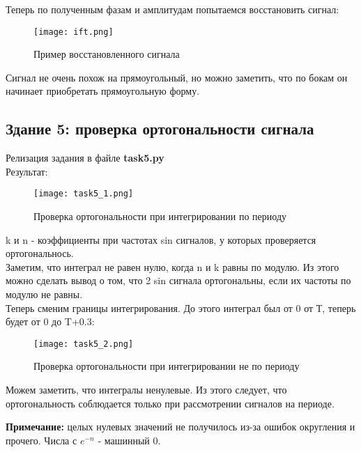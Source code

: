Теперь по полученным фазам и амплитудам попытаемся восстановить сигнал:

\begin{figure}[H]
    \centering
    \texttt{[image: ift.png]}
    \caption{Пример восстановленного сигнала}
\end{figure}

Сигнал не очень похож на прямоугольный, но можно заметить, что по бокам он начинает приобретать прямоугольную форму.

\subsection*{\textbf{Здание 5: проверка ортогональности сигнала}}

Релизация задания в файле \textbf{task5.py} \\

Результат: \\

\begin{figure}[H]
    \centering
    \texttt{[image: task5\_1.png]}
    \caption{Проверка ортогональности при интегрировании по периоду}
\end{figure}

k и n - коэффициенты при частотах sin сигналов, у которых проверяется ортогональнось. \\

Заметим, что интеграл не равен нулю, когда n и k равны по модулю. Из этого можно сделать вывод о том, что 2 sin сигнала
ортогональны, если их частоты по модулю не равны. \\

Теперь сменим границы интегрирования. До этого интеграл был от 0 от Т, теперь будет от 0 до T+0.3:

\begin{figure}[H]
    \centering
    \texttt{[image: task5\_2.png]}
    \caption{Проверка ортогональности при интегрировании не по периоду}
\end{figure}

Можем заметить, что интегралы ненулевые. Из этого следует, что ортогональность соблюдается только при рассмотрении сигналов
на периоде.

\textbf{Примечание:} целых нулевых значений не получилось из-за ошибок округления и прочего. Числа с $e^{-n}$ - машинный 0.



\endinput